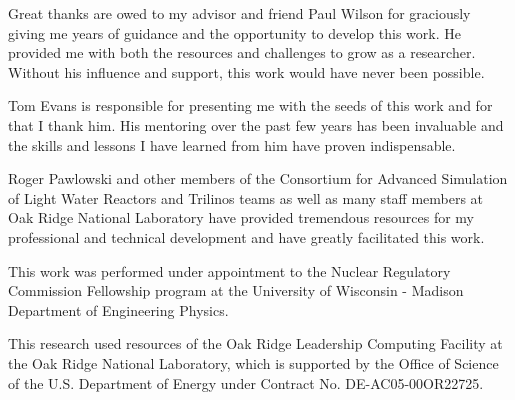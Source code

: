 Great thanks are owed to my advisor and friend Paul Wilson for
graciously giving me years of guidance and the opportunity to develop
this work. He provided me with both the resources and challenges to
grow as a researcher. Without his influence and support, this work
would have never been possible.

Tom Evans is responsible for presenting me with the seeds of this work
and for that I thank him. His mentoring over the past few years has
been invaluable and the skills and lessons I have learned from him
have proven indispensable.

Roger Pawlowski and other members of the Consortium for Advanced
Simulation of Light Water Reactors and Trilinos teams as well as many
staff members at Oak Ridge National Laboratory have provided
tremendous resources for my professional and technical development and
have greatly facilitated this work.

This work was performed under appointment to the Nuclear Regulatory
Commission Fellowship program at the University of Wisconsin - Madison
Department of Engineering Physics.

This research used resources of the Oak Ridge Leadership Computing
Facility at the Oak Ridge National Laboratory, which is supported by
the Office of Science of the U.S. Department of Energy under Contract
No. DE-AC05-00OR22725.
